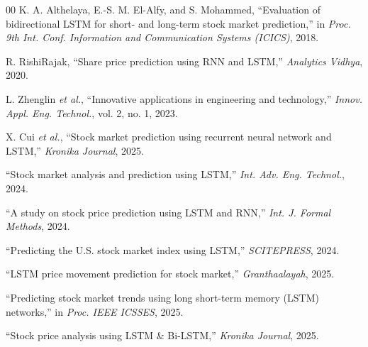 \documentclass[conference]{IEEEtran}
\begin{document}
\begin{thebibliography}{00}
 K. A. Althelaya, E.-S. M. El-Alfy, and S. Mohammed, ``Evaluation of bidirectional LSTM for short- and long-term stock market prediction,'' in \textit{Proc. 9th Int. Conf. Information and Communication Systems (ICICS)}, 2018.

 R. RishiRajak, ``Share price prediction using RNN and LSTM,'' \textit{Analytics Vidhya}, 2020.

 L. Zhenglin \textit{et al.}, ``Innovative applications in engineering and technology,'' \textit{Innov. Appl. Eng. Technol.}, vol. 2, no. 1, 2023.

 X. Cui \textit{et al.}, ``Stock market prediction using recurrent neural network and LSTM,'' \textit{Kronika Journal}, 2025.

 ``Stock market analysis and prediction using LSTM,'' \textit{Int. Adv. Eng. Technol.}, 2024.

 ``A study on stock price prediction using LSTM and RNN,'' \textit{Int. J. Formal Methods}, 2024.

 ``Predicting the U.S. stock market index using LSTM,'' \textit{SCITEPRESS}, 2024.

 ``LSTM price movement prediction for stock market,'' \textit{Granthaalayah}, 2025.

 ``Predicting stock market trends using long short-term memory (LSTM) networks,'' in \textit{Proc. IEEE ICSSES}, 2025.

 ``Stock price analysis using LSTM \& Bi-LSTM,'' \textit{Kronika Journal}, 2025.

\end{thebibliography}
\end{document}
